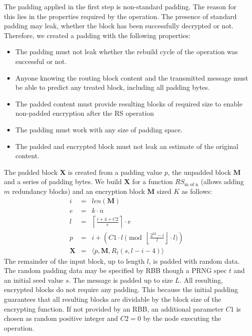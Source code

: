 The padding applied in the first step is non-standard padding. The reason for this lies in the properties required by the operation. The presence of standard padding may leak, whether the block has been successfully decrypted or not. Therefore, we created a padding with the following properties:
\begin{itemize}
	\item The padding must not leak whether the rebuild cycle of the operation was successful or not.
	\item Anyone knowing the routing block content and the transmitted message must be able to predict any treated block, including all padding bytes.
	\item The padded content must provide resulting blocks of required size to enable non-padded encryption after the RS operation
	\item The padding must work with any size of padding space.
	\item The padded and encrypted block must not leak an estimate of the original content.
\end{itemize}

The padded block $\mathbf{X}$ is created from a padding value $p$, the unpadded block $\mathbf{M}$ and a series of padding bytes. We build $\mathbf{X}$ for a function $RS_{\text{m of n}}$ (allows adding $m$ redundancy blocks) and an encryption block $\mathbf{M}$ sized $K$ as follows:
\begin{eqnarray}
i          & = & len(\mathbf{M})\\
e          & = & k \cdot n\\
l          & = & \left\lceil\frac{i + 4 + C2 }{e}\right\rceil\cdot e\\
p          & = & i + \left( C1 \cdot l \pmod{\left\lfloor\frac{2^{32}-i}{l}\right\rfloor\cdot l}\right)\\
\mathbf{X} & = & \langle p,\mathbf{M},R_{t}\left(s,l-i-4\right)\rangle
\end{eqnarray}    
The remainder of the input block, up to length $l$, is padded with random data. The random padding data may be specified by RBB though a PRNG spec $t$ and an initial seed value $s$. The message is padded up to size $L$. All resulting, encrypted blocks do not require any padding. This because the initial padding guarantees that all resulting blocks are dividable by the block size of the encrypting function. If not provided by an RBB, an additional parameter $C1$ is chosen as random positive integer and $C2=0$  by the node executing the operation.

